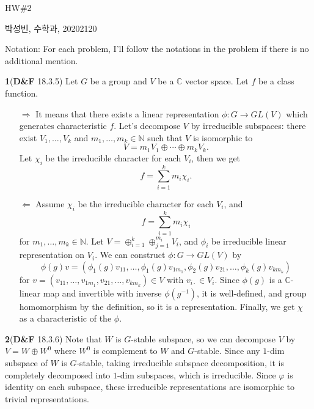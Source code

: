\documentclass[a4paper, 12pt]{article}
\theoremstyle{Mydefinition}
\theoremstyle{Mytheorem}
\begin{document}
\thispagestyle{myfirstpage}
\begin{center}
	\Large{HW\#2}
\end{center}
박성빈, 수학과, 20202120

Notation: For each problem, I'll follow the notations in the problem if there is no additional mention.

\noindent \textbf{1}(\textbf{D\&F} 18.3.5)
Let $G$ be a group and $V$ be a $\mathbb{C}$ vector space. Let $f$ be a class function.

\begin{enumerate}
    \item[$\Rightarrow$] It means that there exists a linear representation $\phi:G\rightarrow GL(V)$ which generates characteristic $f$. Let's decompose $V$ by irreducible subspaces: there exist $V_1, \ldots, V_k$ and $m_1, \ldots, m_k\in \mathbb{N}$ such that $V$ is isomorphic to
    \begin{equation}
        V = m_1V_1\oplus \cdots \oplus m_k V_k.
    \end{equation}
    Let $\chi_i$ be the irreducible character for each $V_i$, then we get
    \begin{equation}
        f = \sum_{i=1}^k m_i \chi_i.
    \end{equation}
    \item[$\Leftarrow$] Assume $\chi_i$ be the irreducible character for each $V_i$, and
    \begin{equation}
        f = \sum_{i=1}^k m_i \chi_i
    \end{equation}
    for $m_1, \ldots, m_k\in \mathbb{N}$. Let $V=\oplus_{i=1}^k \oplus_{j=1}^{m_i} V_i$, and $\phi_i$ be irreducible linear representation on $V_i$. We can construct $\phi:G\rightarrow GL(V)$ by
    \begin{equation}
        \phi(g)v = \left(\phi_1(g)v_{11}, \ldots, \phi_1(g)v_{1m_1}, \phi_2(g)v_{21}, \ldots, \phi_k(g)v_{km_k}\right)
    \end{equation}
    for $v = (v_{11}, \ldots, v_{1m_1}, v_{21}, \ldots, v_{km_k})\in V$ with $v_{i\cdot}\in V_i$. Since $\phi(g)$ is a $\mathbb{C}$-linear map and invertible with inverse $\phi(g^{-1})$, it is well-defined, and group homomorphism by the definition, so it is a representation. Finally, we get $\chi$ as a characteristic of the $\phi$.
\end{enumerate}

\noindent \textbf{2}(\textbf{D\&F} 18.3.6)
Note that $W$ is $G$-stable subspace, so we can decompose $V$ by $V=W\oplus W^0$ where $W^0$ is complement to $W$ and $G$-stable. Since any $1$-dim subspace of $W$ is $G$-stable, taking irreducible subspace decomposition, it is completely decomposed into $1$-dim subspaces, which is irreducible. Since $\varphi$ is identity on each subspace, these irreducible representations are isomorphic to trivial representations.
\end{document}
